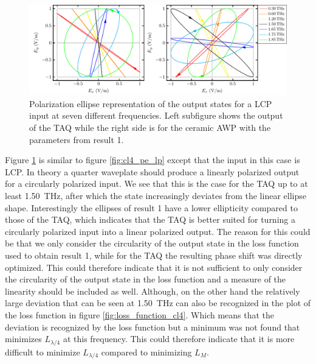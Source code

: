 
\begin{figure}[H]
    \centering
    \includegraphics[scale=0.6]{images/results/plots/ceramic/pe_cl4_cp.pdf}
    \caption{Polarization ellipse representation of the output states for a LCP input at seven different frequencies. Left subfigure shows the output of the TAQ while the right side is for the ceramic AWP with the parameters from result 1.}
    \label{fig:cl4_pe_cp}
\end{figure}

Figure \ref{fig:cl4_pe_cp} is similar to figure \ref{fig:cl4_pe_lp} except that the input in this case is LCP. In theory a quarter waveplate should produce a linearly polarized output for a circularly polarized input. We see that this is the case for the TAQ up to at least \SI{1.50}{\tera \hertz}, after which the state increasingly deviates from the linear ellipse shape. Interestingly the ellipses of result 1 have a lower ellipticity compared to those of the TAQ, which indicates that the TAQ is better suited for turning a circularly polarized input into a linear polarized output. The reason for this could be that we only consider the circularity of the output state in the loss function used to obtain result 1, while for the TAQ the resulting phase shift was directly optimized. This could therefore indicate that it is not sufficient to only consider the circularity of the output state in the loss function and a measure of the linearity should be included as well. Although, on the other hand the relatively large deviation that can be seen at \SI{1.50}{\tera \hertz} can also be recognized in the plot of the loss function in figure \ref{fig:loss_function_cl4}. Which means that the deviation is recognized by the loss function but a minimum was not found that minimizes $L_{\lambda/4}$ at this frequency. This could therefore indicate that it is more difficult to minimize $L_{\lambda/4}$ compared to minimizing $L_M$.

